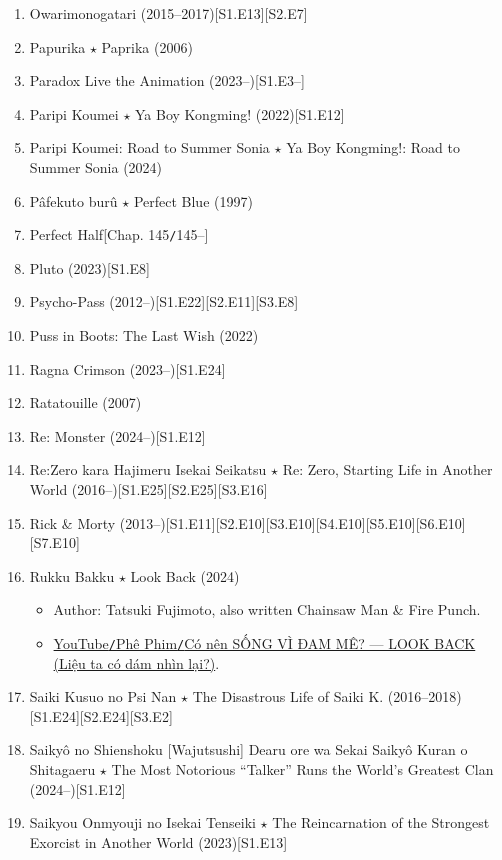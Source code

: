 \documentclass{article}
\begin{document}
\begin{enumerate}
    \item {\sc Owarimonogatari} (2015--2017)\hfill[S1.E13][S2.E7]
    \item {\sc Papurika $\star$ Paprika} (2006)
    \item Paradox Live the Animation (2023--)\hfill[S1.E3--]
    \item {\sc Paripi Koumei $\star$ Ya Boy Kongming!} (2022)\hfill[S1.E12]
    \item {\sc Paripi Koumei: Road to Summer Sonia $\star$ Ya Boy Kongming!: Road to Summer Sonia} (2024)
    \item {\sc Pâfekuto burû $\star$ Perfect Blue} (1997)
    \item Perfect Half\hfill[Chap. 145{\tt/}145--]
    \item {\sc Pluto} (2023)\hfill[S1.E8]
    \item {\sc Psycho-Pass} (2012--)\hfill[S1.E22][S2.E11][S3.E8]
    \item {\sc Puss in Boots: The Last Wish} (2022)
    \item {\sc Ragna Crimson} (2023--)\hfill[S1.E24]
    \item {\sc Ratatouille} (2007)
    \item {\sc Re: Monster} (2024--)\hfill[S1.E12]
    \item {\sc Re:Zero kara Hajimeru Isekai Seikatsu $\star$ Re: Zero, Starting Life in Another World} (2016--)\hfill[S1.E25][S2.E25][S3.E16]
    \item Rick \& Morty (2013--)\hfill[S1.E11][S2.E10][S3.E10][S4.E10][S5.E10][S6.E10][S7.E10]
    \item {\sc Rukku Bakku $\star$ Look Back} (2024)
    \begin{itemize}
    	\item Author: {\sc Tatsuki Fujimoto}, also written Chainsaw Man \& Fire Punch.
    	\item \href{https://www.youtube.com/watch?v=dw_N-6apa_w}{YouTube{\tt/}Phê Phim{\tt/}Có nên SỐNG VÌ ĐAM MÊ? — LOOK BACK (Liệu ta có dám nhìn lại?)}.
    \end{itemize}    
    \item {\sc Saiki Kusuo no Psi Nan $\star$ The Disastrous Life of Saiki K.} (2016--2018)\hfill[S1.E24][S2.E24][S3.E2]
    \item {\sc Saikyô no Shienshoku [Wajutsushi] Dearu ore wa Sekai Saikyô Kuran o Shitagaeru $\star$ The Most Notorious ``Talker'' Runs the World's Greatest Clan} (2024--)\hfill[S1.E12]
    \item {\sc Saikyou Onmyouji no Isekai Tenseiki $\star$ The Reincarnation of the Strongest Exorcist in Another World} (2023)\hfill[S1.E13]

\end{enumerate}
\end{document}

